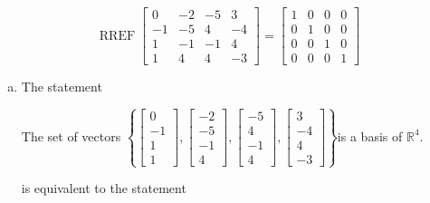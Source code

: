 \begin{exerciseAnswer} 


\[\operatorname{RREF} \left[\begin{array}{cccc}
0 & -2 & -5 & 3 \\
-1 & -5 & 4 & -4 \\
1 & -1 & -1 & 4 \\
1 & 4 & 4 & -3
\end{array}\right] = \left[\begin{array}{cccc}
1 & 0 & 0 & 0 \\
0 & 1 & 0 & 0 \\
0 & 0 & 1 & 0 \\
0 & 0 & 0 & 1
\end{array}\right] \]


\begin{enumerate}[(a)]
\item The statement 
\begin{center}\begin{minipage}{0.8\textwidth}
 The set of vectors \( \left\{ \left[\begin{array}{c}
0 \\
-1 \\
1 \\
1
\end{array}\right] , \left[\begin{array}{c}
-2 \\
-5 \\
-1 \\
4
\end{array}\right] , \left[\begin{array}{c}
-5 \\
4 \\
-1 \\
4
\end{array}\right] , \left[\begin{array}{c}
3 \\
-4 \\
4 \\
-3
\end{array}\right] \right\} \)is a basis of \(\mathbb{R}^4\). 
\end{minipage}\end{center}
     is equivalent to the statement 
\begin{center}\begin{minipage}{0.8\textwidth}
 The set of vectors \( \left\{ \left[\begin{array}{c}
0 \\
-1 \\

\end{array}
\end{minipage}
\end{center}
\end{enumerate}
\end{exerciseAnswer}
